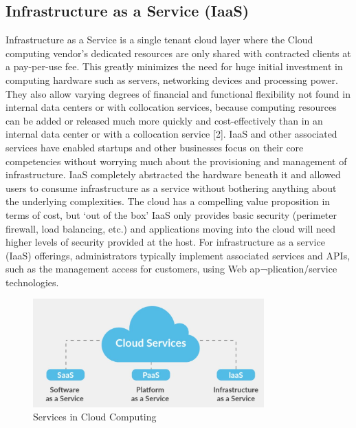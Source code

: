 \documentclass[conference]{IEEEtran}
\begin{document}
\subsection{Infrastructure as a Service (IaaS)}
Infrastructure as a Service is a single tenant cloud layer where the Cloud computing vendor’s dedicated resources are only shared with contracted clients at a pay-per-use fee. This greatly minimizes the need for huge initial investment in computing hardware such as servers, networking devices and processing power. They also allow varying degrees of financial and functional flexibility not found in internal data centers or with collocation services, because computing resources can be added or released much more quickly and cost-effectively than in an internal data center or with a collocation service [2]. IaaS and other associated services have enabled startups and other businesses focus on their core competencies without worrying much about the provisioning and management of infrastructure. IaaS completely abstracted the hardware beneath it and allowed users to consume infrastructure as a service without bothering anything about the underlying complexities. The cloud has a compelling value proposition in terms of cost, but ‘out of the box’ IaaS only provides basic security (perimeter firewall, load balancing, etc.) and applications moving into the cloud will need higher levels of security provided at the host. For infrastructure as a service (IaaS) offerings, administrators typically implement associated services and APIs, such as the management access for customers, using Web ap¬plication/service technologies.

\begin{figure}[ht!] %
\centering
\includegraphics[width=3.5in]{Services-Fig2.JPG}
\caption{Services in Cloud Computing}
\label{Courant_2}
\end{figure}
\end{document}
